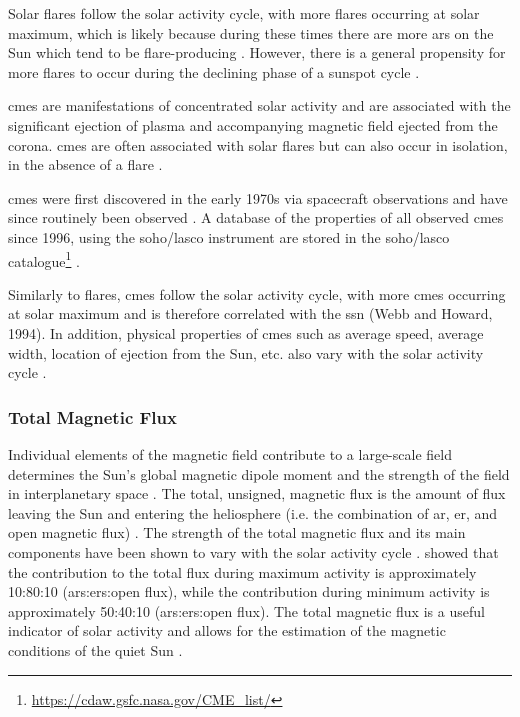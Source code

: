 Solar flares follow the solar activity cycle, with more flares occurring at solar maximum, which is likely because during these times there are more \glspl{ar} on the Sun which tend to be flare-producing \citep{gopalswamy_corona_2010, hathaway_solar_2015}. However, there is a general propensity for more flares to occur during the declining phase of a sunspot cycle \citep{hathaway_solar_2015}.

\glspl{cme} are manifestations of concentrated solar activity and are associated with the significant ejection of plasma and accompanying magnetic field ejected from the corona. \glspl{cme} are often associated with solar flares but can also occur in isolation, in the absence of a flare \citep{hathaway_solar_2015}.

\glspl{cme} were first discovered in the early 1970s via spacecraft observations and have since routinely been observed \citep{hathaway_solar_2015}. A database of the properties of all observed \glspl{cme} since 1996, using the \gls{soho/lasco} instrument are stored in the \gls{soho/lasco} catalogue\footnote{\url{https://cdaw.gsfc.nasa.gov/CME_list/}} \citep{yashiro_catalog_2004, gopalswamy_soholasco_2009}. 

Similarly to flares, \glspl{cme} follow the solar activity cycle, with more \glspl{cme} occurring at solar maximum \citep{gopalswamy_corona_2010} and is therefore correlated with the \gls{ssn} (Webb and Howard, 1994). In addition, physical properties of \glspl{cme} such as average speed, average width, location of ejection from the Sun, etc. also vary with the solar activity cycle \citep{yashiro_catalog_2004}.


\subsubsection*{Total Magnetic Flux}

Individual elements of the magnetic field contribute to a large-scale field determines the Sun's global magnetic dipole moment and the strength of the field in interplanetary space  \citep{lockwood_doubling_1999, solanki_evolution_2000}. The total, unsigned, magnetic flux is the amount of flux leaving the Sun and entering the heliosphere (i.e. the combination of \gls{ar}, \gls{er}, and open magnetic flux) \citep{lockwood_doubling_1999}. The strength of the total magnetic flux and its main components have been shown to vary with the solar activity cycle \citep{solanki_secular_2002, vieira_evolution_2010, chaplin_sensitivity_2019}. \citet{vieira_evolution_2010} showed that the contribution to the total flux during maximum activity is approximately 10:80:10 (\glspl{ar}:\glspl{er}:open flux), while the contribution during minimum activity is approximately 50:40:10 (\glspl{ar}:\glspl{er}:open flux). The total magnetic flux is a useful indicator of solar activity and allows for the estimation of the magnetic conditions of the quiet Sun \citep{vieira_evolution_2010, chaplin_sensitivity_2019}.



